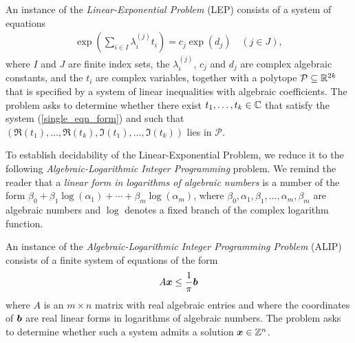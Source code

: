 \begin{definition}
  An instance of the \emph{Linear-Exponential Problem} (LEP) consists of a system
  of equations
\begin{align}
\label{single_eqn_form}
  \exp\left(\sum_{i \in I} \lambda_i^{(j)} t_i \right) = c_j \exp (d_j)
\quad (j \in J),
\end{align}
where $I$ and $J$ are finite index sets, the $\lambda_i^{(j)}$, $c_j$
and $d_j$ are complex algebraic constants, and the $t_i$ are complex
variables, together with a polytope
$\mathcal{P} \subseteq \mathbb{R}^{2k}$ that is specified by a system
of linear inequalities with algebraic coefficients.  The problem asks
to determine whether there exist $t_1,\ldots,t_k\in \mathbb{C}$ that
satisfy the system (\ref{single_eqn_form}) and such that
$(\Re(t_1),\ldots,\Re(t_k),\Im(t_1),\ldots,\Im(t_k))$
lies in $\mathcal{P}$.
\label{def:LEP}
\end{definition}

To establish decidability of the Linear-Exponential Problem, we reduce
it to the following
\emph{Algebraic-Logarithmic Integer Programming}
problem.  We remind the reader that a \emph{linear form in logarithms of algebraic numbers}
is a number of the form
$\beta_{0} + \beta_{1} \log(\alpha_{1}) + \cdots + \beta_{m}
\log(\alpha_{m})$,
where
$\beta_{0}, \alpha_{1}, \beta_{1}, \ldots, \alpha_{m}, \beta_{m}$ are
algebraic numbers and $\log$ denotes a fixed branch of the complex
logarithm function.



\begin{definition}
An instance of the \emph{Algebraic-Logarithmic Integer Programming Problem} (ALIP) consists of a finite system of equations of the form
\begin{align*}
A \boldsymbol{x} \leq \frac{1}{\pi} \boldsymbol{b}
\end{align*}
where $A$ is an $m\times n$ matrix with real algebraic entries and
where the coordinates of $\boldsymbol{b}$ are real linear forms in
logarithms of algebraic numbers. The problem asks to determine whether
such a system admits a solution $\boldsymbol{x} \in \mathbb{Z}^{n}$.
\end{definition}


